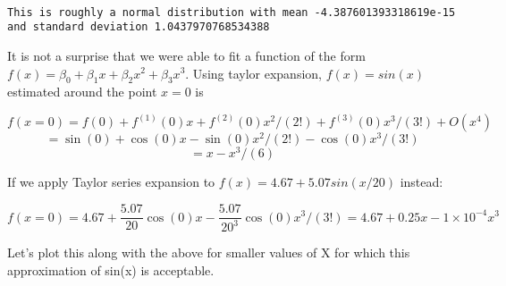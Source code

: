 \documentclass[11pt]{article}
\begin{document}
    \begin{center}
    \end{center}
    { \hspace*{\fill} \\}
    
    \begin{Verbatim}[commandchars=\\\{\}]
This is roughly a normal distribution with mean -4.387601393318619e-15 and standard deviation 1.0437970768534388

    \end{Verbatim}

    It is not a surprise that we were able to fit a function of the form
\(f(x) = \beta_0 + \beta_1 x + \beta_2 x^2 + \beta_3 x^3\). Using taylor
expansion, \(f(x) = sin(x)\) estimated around the point \(x=0\) is

\[f(x=0) = f(0) + f^{(1)}(0)x + f^{(2)}(0)x^2/(2!) + f^{(3)}(0)x^3/(3!) + O(x^4)\]
\[= \sin(0) + \cos(0)x - \sin(0)x^2/(2!) -\cos(0)x^3/(3!)\]
\[= x - x^3/(6)\]

If we apply Taylor series expansion to \(f(x) = 4.67 + 5.07 sin(x/20)\)
instead:

\[f(x=0) = 4.67 + \frac{5.07}{20}\cos(0)x-\frac{5.07}{20^3}\cos(0)x^3/(3!)=4.67 + 0.25x - 1 \times 10^{-4} x^3\]

Let's plot this along with the above for smaller values of X for which
this approximation of sin(x) is acceptable.
\end{document}
